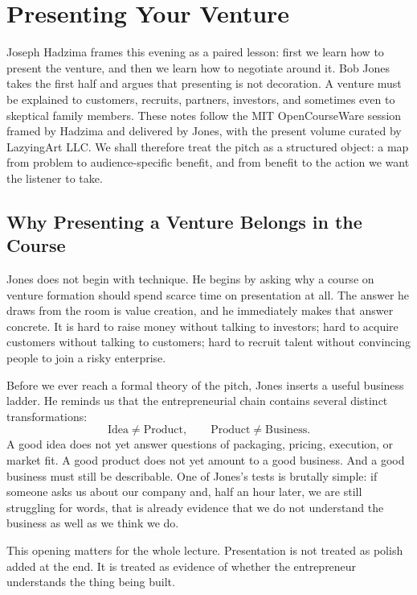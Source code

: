 \chapter{Presenting Your Venture}

Joseph Hadzima frames this evening as a paired lesson: first we learn how to present the venture, and then we learn how to negotiate around it. Bob Jones takes the first half and argues that presenting is not decoration. A venture must be explained to customers, recruits, partners, investors, and sometimes even to skeptical family members. These notes follow the MIT OpenCourseWare session framed by Hadzima and delivered by Jones, with the present volume curated by LazyingArt LLC. We shall therefore treat the pitch as a structured object: a map from problem to audience-specific benefit, and from benefit to the action we want the listener to take.

\section{Why Presenting a Venture Belongs in the Course}

Jones does not begin with technique. He begins by asking why a course on venture formation should spend scarce time on presentation at all. The answer he draws from the room is value creation, and he immediately makes that answer concrete. It is hard to raise money without talking to investors; hard to acquire customers without talking to customers; hard to recruit talent without convincing people to join a risky enterprise.

Before we ever reach a formal theory of the pitch, Jones inserts a useful business ladder. He reminds us that the entrepreneurial chain contains several distinct transformations:
\begin{equation}
\text{Idea} \neq \text{Product}, \qquad \text{Product} \neq \text{Business}.
\end{equation}
A good idea does not yet answer questions of packaging, pricing, execution, or market fit. A good product does not yet amount to a good business. And a good business must still be describable. One of Jones's tests is brutally simple: if someone asks us about our company and, half an hour later, we are still struggling for words, that is already evidence that we do not understand the business as well as we think we do.

This opening matters for the whole lecture. Presentation is not treated as polish added at the end. It is treated as evidence of whether the entrepreneur understands the thing being built.

